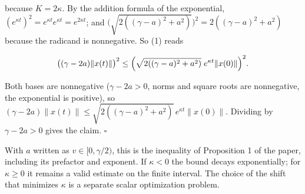 \documentclass[11pt,a4paper]{article}
\begin{document}
because \(K=2\kappa\). By the addition formula of the exponential, \((e^{\kappa t})^2=e^{\kappa t}e^{\kappa t}=e^{2\kappa t}\); and \(\bigl(\sqrt{2((\gamma-a)^2+a^2)}\bigr)^2=2((\gamma-a)^2+a^2)\) because the radicand is nonnegative. So (1) reads


\[\bigl((\gamma-2a)\|x(t)\|\bigr)^2\le\Bigl(\sqrt{2((\gamma-a)^2+a^2)}\;e^{\kappa t}\|x(0)\|\Bigr)^2 .\]


Both bases are nonnegative (\(\gamma-2a>0\), norms and square roots are nonnegative, the exponential is positive), so \((\gamma-2a)\|x(t)\|\le\sqrt{2((\gamma-a)^2+a^2)}\,e^{\kappa t}\|x(0)\|\). Dividing by \(\gamma-2a>0\) gives the claim. \(\square\)




With \(a\) written as \(v\in[0,\gamma/2)\), this is the inequality of Proposition 1 of the paper, including its prefactor and exponent. If \(\kappa<0\) the bound decays exponentially; for \(\kappa\ge0\) it remains a valid estimate on the finite interval. The choice of the shift that minimizes \(\kappa\) is a separate scalar optimization problem.
\end{document}

